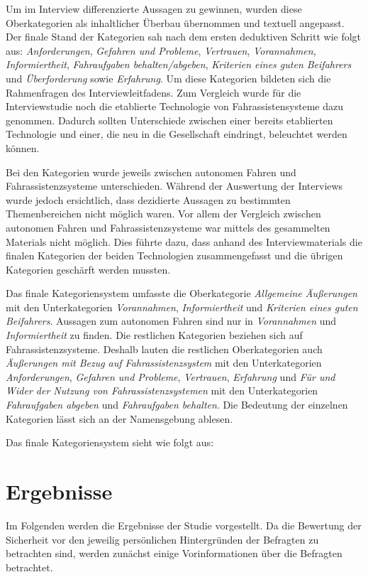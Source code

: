 \documentclass[12pt]{article}
\begin{document}
Um im Interview differenzierte Aussagen zu gewinnen, wurden diese Oberkategorien als inhaltlicher Überbau übernommen und textuell angepasst. Der finale Stand der Kategorien sah nach dem ersten deduktiven Schritt wie folgt aus: \emph{Anforderungen},  \emph{Gefahren und Probleme}, \emph{Vertrauen}, \emph{Vorannahmen}, \emph{Informiertheit}, \emph{Fahraufgaben behalten/abgeben}, \emph{Kriterien eines guten Beifahrers} und \emph{Überforderung} sowie \emph{Erfahrung}. Um diese Kategorien bildeten sich die Rahmenfragen des Interviewleitfadens. Zum Vergleich wurde für die Interviewstudie noch die etablierte Technologie von Fahrassistensysteme dazu genommen. Dadurch sollten Unterschiede zwischen einer bereits etablierten Technologie und einer, die neu in die Gesellschaft eindringt, beleuchtet werden können.

Bei den Kategorien wurde jeweils zwischen autonomen Fahren und Fahrassistenzsysteme unterschieden. Während der Auswertung der Interviews wurde jedoch ersichtlich, dass dezidierte Aussagen zu bestimmten Themenbereichen nicht möglich waren. Vor allem der Vergleich zwischen autonomen Fahren und Fahrassistenzsysteme war mittels des gesammelten Materials nicht möglich. Dies führte dazu, dass anhand des Interviewmaterials die finalen Kategorien der beiden Technologien zusammengefasst und die übrigen Kategorien geschärft werden mussten. %

Das finale Kategoriensystem umfasste die Oberkategorie \emph{Allgemeine Äußerungen} mit den Unterkategorien \emph{Vorannahmen}, \emph{Informiertheit} und \emph{Kriterien eines guten Beifahrers}. Aussagen zum autonomen Fahren sind nur in \emph{Vorannahmen} und \emph{Informiertheit} zu finden. Die restlichen Kategorien beziehen sich auf Fahrassistenzsysteme. Deshalb lauten die restlichen Oberkategorien auch \emph{Äußerungen mit Bezug auf Fahrassistenzsystem} mit den Unterkategorien \emph{Anforderungen}, \emph{Gefahren und Probleme}, \emph{Vertrauen}, \emph{Erfahrung} und \emph{Für und Wider der Nutzung von Fahrassistenzsystemen} mit den Unterkategorien \emph{Fahraufgaben abgeben} und \emph{Fahraufgaben behalten}. Die Bedeutung der einzelnen Kategorien lässt sich an der Namensgebung ablesen.

Das finale Kategoriensystem sieht wie folgt aus:


\clearpage
\section{Ergebnisse}
Im Folgenden werden die Ergebnisse der Studie vorgestellt. Da die Bewertung der Sicherheit vor den jeweilig persönlichen Hintergründen der Befragten zu betrachten sind, werden zunächst einige Vorinformationen über die Befragten betrachtet.
\end{document}
